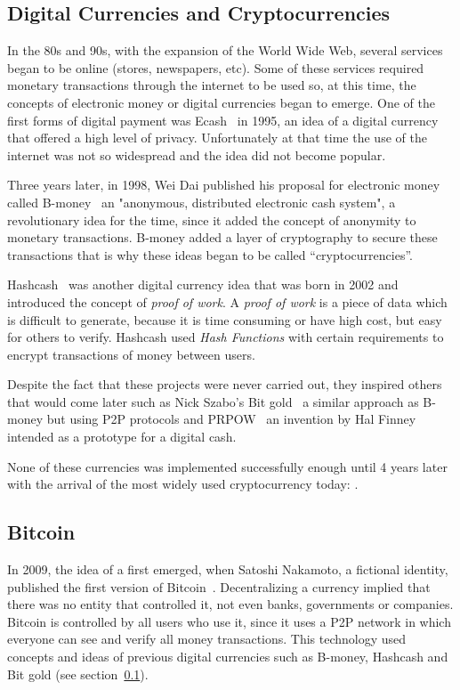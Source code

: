 \subsection{Digital Currencies and Cryptocurrencies}
\label{tb:cryptos}

In the 80s and 90s, with the expansion of the World Wide Web, several services
began to be online (stores, newspapers, etc). Some of these services required
monetary transactions through the internet to be used so, at this time, the
concepts of electronic money or digital currencies began to emerge. One of the
first forms of digital payment was Ecash~\cite{chaum1995introduction} in 1995,
an idea of a digital currency that offered a high level of privacy.
Unfortunately at that time the use of the internet was not so widespread and the
idea did not become popular.

Three years later, in 1998, Wei Dai published his proposal for electronic money
called B-money~\cite{dai1998b} an "anonymous, distributed electronic cash
system", a revolutionary idea for the time, since it added the concept of
anonymity to monetary transactions. B-money added a layer of cryptography to
secure these transactions that is why these ideas began to be called
``cryptocurrencies''.

Hashcash~\cite{back2002hashcash} was another digital currency idea that was born
in 2002 and introduced the concept of \emph{proof of work}. A \emph{proof of
  work} is a piece of data which is difficult to generate, because it is time
consuming or have high cost, but easy for others to verify. Hashcash used
\emph{Hash Functions} with certain requirements to encrypt transactions of money
between users.

Despite the fact that these projects were never carried out, they inspired
others that would come later such as Nick Szabo's Bit gold~\cite{szabo2008bit} a
similar approach as B-money but using P2P protocols and
PRPOW~\cite{finney2005rpow} an invention by Hal Finney intended as a prototype
for a digital cash.

None of these currencies was implemented successfully enough until 4 years later
with the arrival of the most widely used cryptocurrency today: .

\subsection{Bitcoin}
\label{tb:bc}


In 2009, the idea of a  first emerged, when
Satoshi Nakamoto, a fictional identity, published the first version of
Bitcoin~\cite{nakamoto2008bitcoin}. Decentralizing a currency implied that there
was no entity that controlled it, not even banks, governments or companies.
Bitcoin is controlled by all users who use it, since it uses a P2P network in
which everyone can see and verify all money transactions. This technology used
concepts and ideas of previous digital currencies such as B-money, Hashcash and
Bit gold (see section~\ref{tb:cryptos}).

